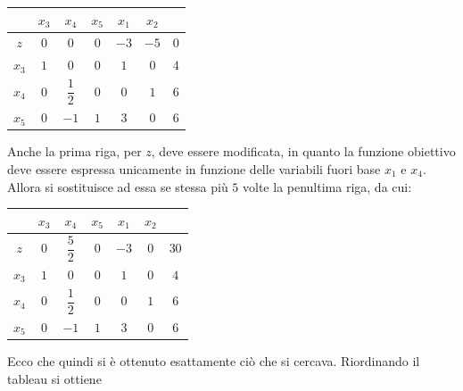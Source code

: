 \documentclass[a4paper]{extarticle}
\renewcommand\arraystretch{}
\begin{document}
\vspace{1em}
\noindent
\begin{table}[H]
    \setlength{\tabcolsep}{4pt}
    \renewcommand{\arraystretch}{2.2}
    \noindent
    \centering
    \begin{tabular}{c|ccc|cc|c}
        & $x_3$ & $x_4$ & $x_5$ & $x_1$ & $x_2$ & \\
        \hline
        $z$   & $0$   & $0$   & $0$   & $-3$  & $-5$  & $0$\\
        \hline
        $x_3$ & $1$   & $0$   & $0$   & $1$   & $0$   & $4$\\ 
        $x_4$ & $0$   & $\dfrac{1}{2}$   & $0$   & $0$   & $1$   & $6$\\
        $x_5$ & $0$   & $-1$   & $1$   & $3$   & $0$   & $6$\\
    \end{tabular}
\end{table}
\noindent
Anche la prima riga, per $z$, deve essere modificata, in quanto la funzione obiettivo deve essere espressa unicamente in funzione delle variabili fuori base $x_1$ e $x_4$. Allora si sostituisce ad essa se stessa più $5$ volte la penultima riga, da cui:
\vspace{1em}
\noindent
\begin{table}[H]
    \setlength{\tabcolsep}{4pt}
    \renewcommand{\arraystretch}{2.2}
    \noindent
    \centering
    \begin{tabular}{c|ccc|cc|c}
        & $x_3$ & $x_4$ & $x_5$ & $x_1$ & $x_2$ & \\
        \hline
        $z$   & $0$   & $\dfrac{5}{2}$   & $0$   & $-3$  & $0$  & $30$\\
        \hline
        $x_3$ & $1$   & $0$   & $0$   & $1$   & $0$   & $4$\\ 
        $x_4$ & $0$   & $\dfrac{1}{2}$   & $0$   & $0$   & $1$   & $6$\\
        $x_5$ & $0$   & $-1$   & $1$   & $3$   & $0$   & $6$\\
    \end{tabular}
\end{table}
\noindent
Ecco che quindi si è ottenuto esattamente ciò che si cercava. Riordinando il tableau si ottiene
\vspace{1em}
\noindent
\end{document}

